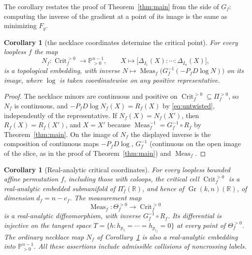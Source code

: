 \documentclass[11pt]{article}
\newtheorem{corollary}[theorem]{Corollary}
\theoremstyle{definition}
\DeclareMathOperator{\Gr}{Gr}
\DeclareMathOperator{\Meas}{Meas}
\DeclareMathOperator{\Crit}{Crit}
\newcommand{\Thef}{\Theta_f^{>0}}
\newcommand{\Critf}{\Crit_f^{>0}}
\begin{document}
The corollary restates the proof of Theorem~\ref{thm:main} from the side of $G_f$: computing the inverse of the
gradient at a point of its image is the same as minimizing $F_y$.



\begin{corollary}[the necklace coordinates determine the critical point]\label{cor:necklace-embedding}
For every loopless $f$ the map
\[
   N_f\colon\Critf\to\mathbb P^{n-1}_{>0},\qquad X\mapsto\bigl[\Delta_{I_1}(X):\cdots:\Delta_{I_n}(X)\bigr],
\]
is a topological embedding, with inverse $N\mapsto\Meas_f\bigl(G_f^{-1}(-P_fD\log N)\bigr)$ on its image,
where $\log$ is taken coordinatewise on any positive representative.
\end{corollary}

\begin{proof}
The necklace minors are continuous and positive on $\Critf\subseteq\Pi_f^{>0}$, so $N_f$ is continuous,
and $-P_fD\log N_f(X)=R_f(X)$ by \eqref{eq:untwisted}, independently of the representative. If
$N_f(X)=N_f(X')$, then $R_f(X)=R_f(X')$, and $X=X'$ because $\Meas_f^{-1}=G_f^{-1}\circ R_f$ by
Theorem~\ref{thm:main}. On the image of $N_f$ the displayed inverse is the composition of continuous maps
$-P_fD\log$, $G_f^{-1}$ (continuous on the open image of the slice, as in the proof of
Theorem~\ref{thm:main}) and $\Meas_f$.
\end{proof}

\begin{corollary}[Real-analytic critical coordinates]\label{cor:analytic-critical}
For every loopless bounded affine permutation $f$, including those with coloops,
the critical cell $\Critf$ is a real-analytic embedded submanifold of
$\Pi_f^\circ(\mathbb R)$, and hence of $\Gr(k,n)(\mathbb R)$, of dimension
$d_f=n-c_f$. The measurement map
\[
  \Meas_f:\Thef\longrightarrow\Critf
\]
is a real-analytic diffeomorphism, with inverse $G_f^{-1}\circ R_f$.
Its differential is injective on the tangent space
$T=\{h:h_{p_1}=\cdots=h_{p_{c_f}}=0\}$ at every point of $\Thef$.
The ordinary necklace map $N_f$ of Corollary~\ref{cor:necklace-embedding}
is also a real-analytic embedding into $\mathbb P^{n-1}_{>0}$.
All these assertions include admissible collisions of noncrossing labels.
\end{corollary}
\end{document}
